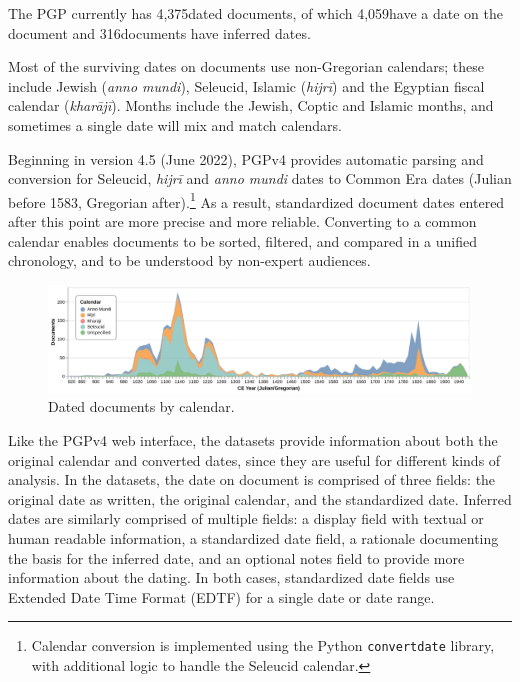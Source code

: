 \documentclass{article}
\def\totalDatedDocs{4,375}
\def\totalDateOnDoc{4,059}
\def\totalInferredDate{316}
\begin{document}
The PGP currently has \totalDatedDocs\space dated documents, of which \totalDateOnDoc\space have a date on the document and \totalInferredDate\space documents have inferred dates.  

Most of the surviving dates on documents use non-Gregorian calendars; these include Jewish  (\textit{anno mundi}),  Seleucid,  Islamic (\textit{hijrī}) and the Egyptian fiscal calendar (\textit{kharājī}). Months include the Jewish, Coptic and Islamic months, and sometimes a single date will mix and match calendars. 

Beginning in version 4.5 (June 2022), PGPv4 provides automatic parsing and conversion for Seleucid, \textit{hijrī} and \textit{anno mundi} dates to Common Era dates (Julian before 1583, Gregorian after).\footnote{Calendar conversion is implemented using the Python \texttt{convertdate} library, with additional logic to handle the Seleucid calendar.} As a result, standardized document dates entered after this point are more precise and more reliable. Converting to a common calendar enables documents to be sorted, filtered, and compared in a unified chronology, and to be understood by non-expert audiences.

\begin{figure}[!hbt]
  \centering
  \includegraphics[width=\textwidth]{charts/dated_docs_by_cal.pdf}
  \caption{Dated documents by calendar.}
  \label{fig:docs_dating_combined}
\end{figure}

Like the PGPv4 web interface, the datasets provide information about both the original calendar and converted dates, since they are useful for different kinds of analysis. In the datasets, the date on document is comprised of three fields: the original date as written, the original calendar, and the standardized date.  Inferred dates are similarly comprised of multiple fields: a display  field with textual or human readable information, a standardized date field, a rationale documenting the basis for the inferred date, and an optional notes field to provide more information about the dating.   In both cases, standardized date fields use Extended Date Time Format (EDTF) for a single date or date range.
\end{document}
